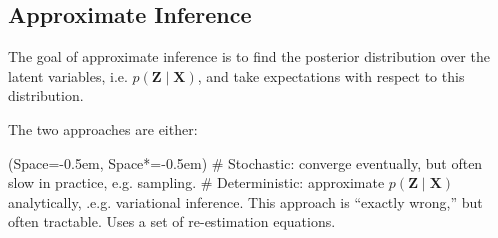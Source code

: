 \documentclass[12pt, a4paper]{article}
\newcommand{\listSpace}{-0.5em}%
\newcommand{\vect}[1]{\bm{#1}}
\begin{document}
\subsection{Approximate Inference}

The goal of approximate inference is to find the posterior distribution over the latent variables, i.e. $p(\vect{Z} \mid \vect{X})$, and take expectations with respect to this distribution.

The two approaches are either:
\begin{easylist}[itemize]
	\ListProperties(Space=\listSpace, Space*=\listSpace)
	# Stochastic: converge eventually, but often slow in practice, e.g. sampling.
	# Deterministic: approximate $p(\vect{Z} \mid \vect{X})$ analytically, .e.g. variational inference.
	This approach is ``exactly wrong,'' but often tractable. 
	Uses a set of re-estimation equations.
\end{easylist}
\end{document}
